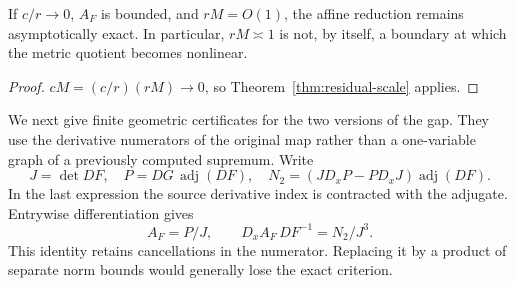 \begin{corollary}\label{cor:false-wall}
If $c/r\to0$, $A_F$ is bounded, and $rM=O(1)$, the affine reduction remains
asymptotically exact. In particular, $rM\asymp1$ is not, by itself, a boundary
at which the metric quotient becomes nonlinear.
\end{corollary}
\begin{proof}
$cM=(c/r)(rM)\to0$, so Theorem~\ref{thm:residual-scale} applies.
\end{proof}

We next give finite geometric certificates for the two versions of the gap.
They use the derivative numerators of the original map rather than a
one-variable graph of a previously computed supremum. Write
\begin{equation}\label{eq:polar-ideals}
 J=\det DF,\quad P=DG\,\operatorname{adj}(DF),\quad
 N_2=(J D_xP-P D_xJ)\operatorname{adj}(DF).
\end{equation}
In the last expression the source derivative index is contracted with the
adjugate. Entrywise differentiation gives
\[
 A_F=P/J,\qquad D_xA_F\,DF^{-1}=N_2/J^3.
\]
This identity retains cancellations in the numerator. Replacing it by a
product of separate norm bounds would generally lose the exact criterion.


